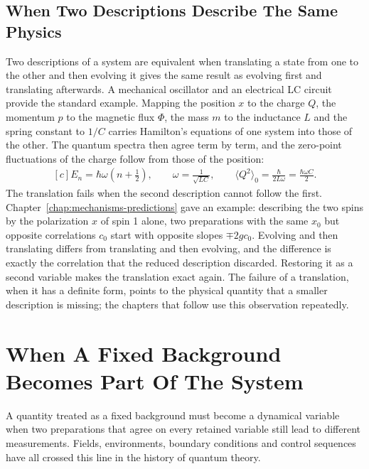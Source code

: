 \documentclass[11pt,oneside]{book}
\newenvironment{centeredalign}{\[\begin{gathered}[c]}{\end{gathered}\]}
\begin{document}
\section{When Two Descriptions Describe The Same Physics}
Two descriptions of a system are equivalent when translating a state from one to the other and then evolving it gives
the same result as evolving first and translating afterwards. A mechanical oscillator and an electrical LC circuit
provide the standard example. Mapping the position \(x\) to the charge \(Q\), the momentum \(p\) to the magnetic flux
\(\Phi\), the mass \(m\) to the inductance \(L\) and the spring constant to \(1/C\) carries Hamilton's equations of one
system into those of the other. The quantum spectra then agree term by term, and the zero-point fluctuations of the
charge follow from those of the position:
\begin{centeredalign}
E_n=\hbar\omega\left(n+\tfrac12\right),\qquad \omega=\frac{1}{\sqrt{LC}},\qquad
\langle Q^2\rangle_0=\frac{\hbar}{2L\omega}=\frac{\hbar\omega C}{2}.
\end{centeredalign}
The translation fails when the second description cannot follow the first. Chapter~\ref{chap:mechanisms-predictions}
gave an example: describing the two spins by the polarization \(x\) of spin 1 alone, two preparations with the same
\(x_0\) but opposite correlations \(c_0\) start with opposite slopes \(\mp2gc_0\). Evolving and then translating
differs from translating and then evolving, and the difference is exactly the correlation that the reduced
description discarded. Restoring it as a second variable makes the translation exact again. The failure of a
translation, when it has a definite form, points to the physical quantity that a smaller description is missing; the
chapters that follow use this observation repeatedly.



\chapter{When A Fixed Background Becomes Part Of The System}\label{chap:background}
\begin{claimbox}
A quantity treated as a fixed background must become a dynamical variable when two preparations that agree on every
retained variable still lead to different measurements. Fields, environments, boundary conditions and control
sequences have all crossed this line in the history of quantum theory.
\end{claimbox}
\end{document}
